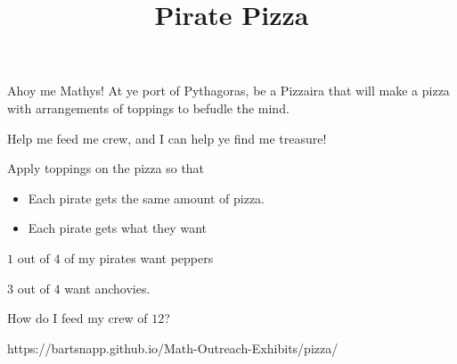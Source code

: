 \documentclass{../exhibit}
\title{Pirate Pizza}
\begin{document}
\begin{context}
  Ahoy me Mathys! At ye port of Pythagoras, be a Pizzaira that will
  make a pizza with arrangements of toppings to befudle the mind.


  \vspace{1cm}

  
  Help me feed me crew, and I can help ye find me treasure!
\end{context}



\begin{directions}
  Apply toppings on the pizza so that
  \begin{itemize}
  \item Each pirate gets the same amount of pizza.
  \item Each pirate gets what they want
  \end{itemize}
\end{directions}



\begin{example}
  $1$ out of $4$ of my pirates want peppers

  $3$ out of $4$ want anchovies.


  How do I feed my crew of $12$?
\begin{center}
\end{center}
\end{example}



\begin{mathConnections}
  https://bartsnapp.github.io/Math-Outreach-Exhibits/pizza/
\end{mathConnections}
\end{document}
